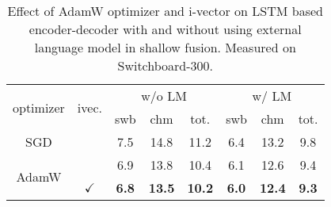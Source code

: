 \documentclass[a4paper]{article}
\begin{document}
\begin{table}
  \eightpt
  \centering
  \caption{Effect of AdamW optimizer and i-vector on LSTM based encoder-decoder with and without using external language model in shallow fusion. Measured on Switchboard-300.}
  \vspace{-3.5mm}
  \begin{tabular}{|@{}c@{}|@{}c@{}||c|c|c||c|c|c|}
    \hline
\multirow{2}{*}{\hspace{1mm}optimizer\hspace{1mm}} & \multirow{2}{*}{\hspace{1mm}ivec.\hspace{1mm}}     & \multicolumn{3}{c||}{w/o LM} & \multicolumn{3}{|c|}{w/ LM} \\
\cline{3-8}
                           &                            &  swb & chm & tot. & swb & chm & tot. \\
\hline            
\hline            
              SGD       &                               &  7.5 & 14.8 & 11.2 & 6.4 & 13.2 & 9.8  \\ \cline{1-1}\cline{3-8}
\multirow{2}{*}{AdamW}  &                               &  6.9 & 13.8 & 10.4 & 6.1 & 12.6 & 9.4  \\ \cline{2-8}
                        & \multirow{1}{*}{$\checkmark$} &  \bf{6.8} & \bf{13.5} & \bf{10.2} & \bf{6.0} & \bf{12.4} & \bf{9.3}  \\
\hline
\end{tabular}                              
\label{tab:lstm_adamw_ivec}
\vspace{-2mm}
\end{table}
\end{document}
